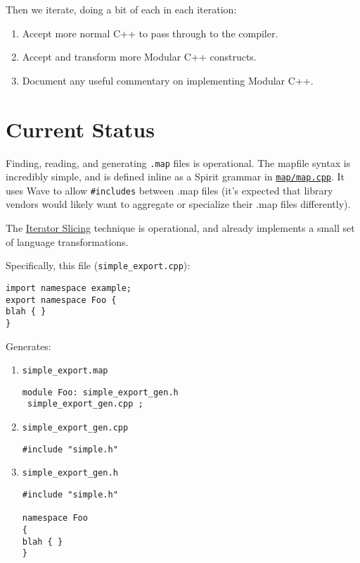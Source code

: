 \documentclass[leqno,fleqn, twocolumn]{article}
\begin{document}
Then we iterate, doing a bit of each in each iteration:
\begin{enumerate}
\item Accept more normal C++ to pass through to the compiler.
\item Accept and transform more Modular C++ constructs.
\item Document any useful commentary on implementing Modular C++.
\end{enumerate}


\section{Current Status}
Finding, reading, and generating \texttt{.map} files is operational.  The mapfile syntax is incredibly simple, and is defined inline as a Spirit grammar in \href{https://boost-consulting.com:8443/trac/soc/browser/boost/soc/2006/modules/trunk/map/map.cpp?rev=406}{\texttt{map/map.cpp}}.  It uses Wave to allow \texttt{\#includes} between .map files (it's expected that library vendors would likely want to aggregate or specialize their .map files differently).  

The \href{http://2006.planet-soc.com/node/326}{Iterator Slicing} technique is operational, and already implements a small set of language transformations.

Specifically, this file (\texttt{simple\_export.cpp}):

\begin{verbatim}
import namespace example;
export namespace Foo {
blah { }
}
\end{verbatim}

Generates:
\begin{enumerate}
\item \texttt{simple\_export.map}

\begin{verbatim}
module Foo: simple_export_gen.h
 simple_export_gen.cpp ;
\end{verbatim}
\item \texttt{simple\_export\_gen.cpp}

\begin{verbatim}
#include "simple.h"
\end{verbatim}
\item \texttt{simple\_export\_gen.h}

\begin{verbatim}
#include "simple.h"

namespace Foo 
{
blah { }
}
\end{verbatim}
\end{enumerate}
\end{document}
